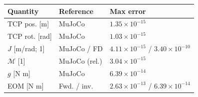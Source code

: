 {\footnotesize
\setlength{\tabcolsep}{2pt}
\begin{tabular}{@{}lll@{}}
\hline
Quantity & Reference & Max error \\
\hline
TCP pos. [m] & MuJoCo & $1.35\times10^{-15}$ \\
TCP rot. [rad] & MuJoCo & $1.03\times10^{-15}$ \\
$J$ [m/rad; 1] & MuJoCo / FD & $4.11\times10^{-15}$ / $3.40\times10^{-10}$ \\
$\mathcal{M}$ [1] & MuJoCo (rel.) & $3.04\times10^{-15}$ \\
$g$ [N m] & MuJoCo & $6.39\times10^{-14}$ \\
EOM [N m] & Fwd. / inv. & $2.63\times10^{-13}$ / $6.39\times10^{-14}$ \\
\hline
\end{tabular}
}
